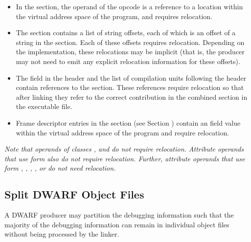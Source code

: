 \begin{itemize}
\item In the \dotdebugline{} section, the operand of the \DWLNEsetaddress{}
opcode is a reference to a location within the virtual address space
of the program, and requires relocation.

\item The \dotdebugstroffsets{} section contains a list of string offsets,
each of which is an offset of a string in the \dotdebugstr{} section. Each
of these offsets requires relocation. Depending on the implementation,
these relocations may be implicit (that is, the producer may not need to
emit any explicit relocation information for these offsets).

\item The \HFNdebuginfooffset{} field in the \dotdebugaranges{} header and 
the list of compilation units following the \dotdebugnames{} header contain 
references to the \dotdebuginfo{} section.  These references require relocation 
so that after linking they refer to the correct contribution in the combined 
\dotdebuginfo{} section in the executable file.

\item Frame descriptor entries in the \dotdebugframe{} section 
(see Section ) contain an 
\HFNinitiallocation{} field value within the virtual address 
space of the program and require relocation. 

\end{itemize}

\textit{Note that operands of classes \CLASSblock, \CLASSconstant{} and 
\CLASSflag{} do not require relocation. Attribute operands that use 
form \DWFORMstring{} also do not require relocation. Further, 
attribute operands that use form
\DWFORMrefone, \DWFORMreftwo, \DWFORMreffour, \DWFORMrefeight, or
\DWFORMrefudata{} do not need relocation.}

\subsection{Split DWARF Object Files}
\label{datarep:splitdwarfobjectfiles}
A DWARF producer may partition the debugging
information such that the majority of the debugging
information can remain in individual object files without
being processed by the linker. 

